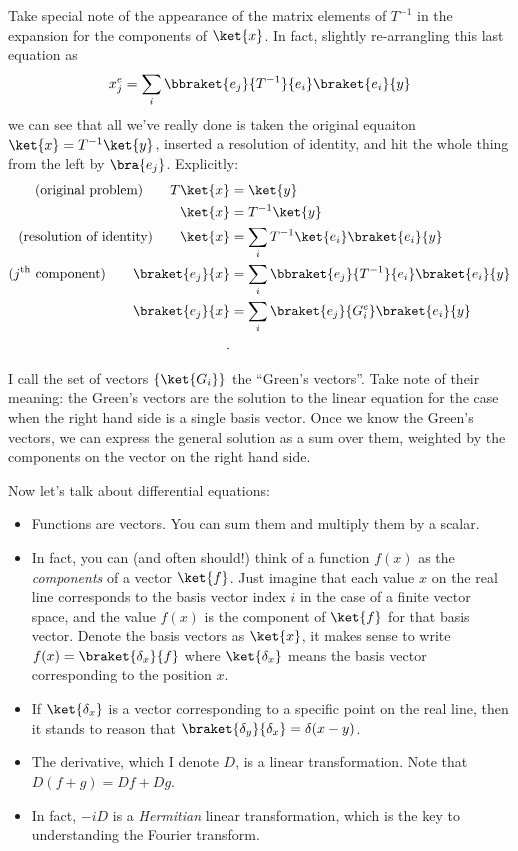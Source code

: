 Take special note of the appearance of the matrix elements of $T^{-1}$ in the expansion for the components of $\ket{x}$.
In fact, slightly re-arrangling this last equation as
\begin{equation*}
  x_j^e = \sum_i \bbraket{e_j}{T^{-1}}{e_i}\braket{e_i}{y}
\end{equation*}
we can see that all we've really done is taken the original equaiton $\ket{x} = T^{-1}\ket{y}$, inserted a resolution of identity, and hit the whole thing from the left by $\bra{e_j}$.
Explicitly:
\begin{align*}
  \text{(original problem)} \qquad T \ket{x} &= \ket{y} \\
  \ket{x} &= T^{-1} \ket{y} \\
  \text{(resolution of identity)} \qquad \ket{x} &= \sum_i T^{-1}\ket{e_i} \braket{e_i}{y} \\
  \text{(}j^\text{th} \text{ component)} \qquad \braket{e_j}{x} &= \sum_i \bbraket{e_j}{T^{-1}}{e_i} \braket{e_i}{y} \\
  \braket{e_j}{x} &= \sum_i \braket{e_j}{G_i^e} \braket{e_i}{y} \\
  \, .
\end{align*}


I call the set of vectors $\{ \ket{G_i} \}$ the ``Green's vectors''.
Take note of their meaning: the Green's vectors are the solution to the linear equation for the case when the right hand side is a single basis vector.
Once we know the Green's vectors, we can express the general solution as a sum over them, weighted by the components on the vector on the right hand side.


Now let's talk about differential equations:
\begin{itemize}
  \item Functions are vectors. You can sum them and multiply them by a scalar.
  \item In fact, you can (and often should!) think of a function $f(x)$ as the \emph{components} of a vector $\ket{f}$. Just imagine that each value $x$ on the real line corresponds to the basis vector index $i$ in the case of a finite vector space, and the value $f(x)$ is the component of $\ket{f}$ for that basis vector. Denote the basis vectors as $\ket{x}$, it makes sense to write $f(x) = \braket{\delta_x}{f}$ where $\ket{\delta_x}$ means the basis vector corresponding to the position $x$.
  \item If $\ket{\delta_x}$ is a vector corresponding to a specific point on the real line, then it stands to reason that $\braket{\delta_y}{\delta_x} = \delta(x - y)$.
  \item The derivative, which I denote $D$, is a linear transformation. Note that $D(f + g) = Df + Dg$.
  \item In fact, $-iD$ is a \emph{Hermitian} linear transformation, which is the key to understanding the Fourier transform.
\end{itemize}

